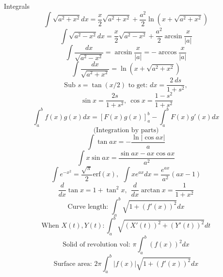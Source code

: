 \begin{misc}{Integrals}
  $$\int \sqrt{a^2+x^2} dx = \frac{x}{2}\sqrt{a^2+x^2} + \frac{a^2}{2}\ln (x+\sqrt{a^2+x^2})$$
  $$\int \sqrt{a^2-x^2} dx = \frac{x}{2}\sqrt{a^2-x^2} + \frac{a^2}{2}\arcsin\frac{x}{|a|}$$
  $$\int \frac{dx}{\sqrt{a^2-x^2}} = \arcsin\frac{x}{|a|} = -\arccos\frac{x}{|a|}$$
  $$\int \frac{dx}{\sqrt{a^2+x^2}} = \ln (x+\sqrt{a^2+x^2})$$
  $$\text{Sub } s = \tan(x/2) \text{ to get: } dx =  \frac{2\ ds}{1+s^2},$$
  $$\ \sin x = \frac{2s}{1+s^2},\ \cos x = \frac{1-s^2}{1+s^2}$$
  $$\int_a^bf(x)g(x)dx = [F(x)g(x)]_a^b-\int_a^bF(x)g'(x)dx$$
  $$\text{(Integration by parts)}$$
  $$\int\tan ax = -\dfrac{\ln|\cos ax|}{a}$$
  $$\int x\sin ax = \dfrac{\sin ax-ax \cos ax}{a^2}$$
  $$\int e^{-x^2} = \frac{\sqrt \pi}{2} \text{erf}(x), \ \ \int xe^{ax}dx = \frac{e^{ax}}{a^2}(ax-1)$$
  $$\dfrac{d}{dx}\tan x = 1+\tan^2x, \ \  \dfrac{d}{dx}\arctan x = \dfrac{1}{1+x^2}$$
  $$\text{Curve length: } \int_a^b\sqrt{1+(f'(x))^2}dx$$
  $$\text{When } X(t), Y(t): \int_a^b\sqrt{(X'(t))^2+(Y'(t))^2}dt$$
  $$\text{Solid of revolution vol: } \pi\int_a^b(f(x))^2dx$$
  $$\text{Surface area: } 2\pi\int_a^b|f(x)|\sqrt{1+(f'(x))^2}dx$$
\end{misc}

